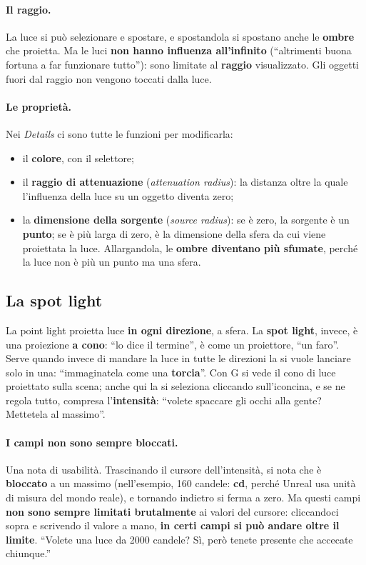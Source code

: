 \paragraph{Il raggio.} La luce si può selezionare e spostare, e spostandola si
spostano anche le \textbf{ombre} che proietta. Ma le luci \textbf{non hanno
influenza all'infinito} (``altrimenti buona fortuna a far funzionare tutto''):
sono limitate al \textbf{raggio} visualizzato. Gli oggetti fuori dal raggio non
vengono toccati dalla luce.

\paragraph{Le proprietà.} Nei \emph{Details} ci sono tutte le funzioni per
modificarla:
\begin{itemize}
  \item il \textbf{colore}, con il selettore;
  \item il \textbf{raggio di attenuazione} (\emph{attenuation radius}): la
        distanza oltre la quale l'influenza della luce su un oggetto diventa
        zero;
  \item la \textbf{dimensione della sorgente} (\emph{source radius}): se è
        zero, la sorgente è un \textbf{punto}; se è più larga di zero, è la
        dimensione della sfera da cui viene proiettata la luce. Allargandola, le
        \textbf{ombre diventano più sfumate}, perché la luce non è più un punto
        ma una sfera.
\end{itemize}

\subsection{La spot light}

La point light proietta luce \textbf{in ogni direzione}, a sfera. La
\textbf{spot light}, invece, è una proiezione \textbf{a cono}: ``lo dice il
termine'', è come un proiettore, ``un faro''. Serve quando invece di mandare la
luce in tutte le direzioni la si vuole lanciare solo in una: ``immaginatela come
una \textbf{torcia}''. Con G si vede il cono di luce proiettato sulla scena;
anche qui la si seleziona cliccando sull'iconcina, e se ne regola tutto,
compresa l'\textbf{intensità}: ``volete spaccare gli occhi alla gente? Mettetela
al massimo''.

\paragraph{I campi non sono sempre bloccati.} Una nota di usabilità.
Trascinando il cursore dell'intensità, si nota che è \textbf{bloccato} a un
massimo (nell'esempio, 160 candele: \textbf{cd}, perché Unreal usa unità di
misura del mondo reale), e tornando indietro si ferma a zero. Ma questi campi
\textbf{non sono sempre limitati brutalmente} ai valori del cursore:
cliccandoci sopra e scrivendo il valore a mano, \textbf{in certi campi si può
andare oltre il limite}. ``Volete una luce da 2000 candele? Sì, però tenete
presente che accecate chiunque.''

